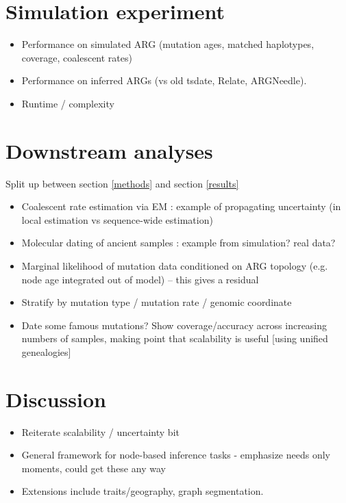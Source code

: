 \documentclass{article}
\begin{document}
\section{Simulation experiment}
\begin{itemize}
\item Performance on simulated ARG (mutation ages, matched haplotypes, coverage, coalescent rates)
\item Performance on inferred ARGs (vs old tsdate, Relate, ARGNeedle).
\item Runtime / complexity
\end{itemize}


\section{Downstream analyses}
Split up between section \ref{methods} and section \ref{results}
\begin{itemize}
\item Coalescent rate estimation via EM : example of propagating uncertainty (in local estimation vs sequence-wide estimation)
\item Molecular dating of ancient samples : example from simulation? real data?
\item Marginal likelihood of mutation data conditioned on ARG topology (e.g. node age integrated out of model) -- this gives a residual
\item Stratify by mutation type / mutation rate / genomic coordinate
\item Date some famous mutations? Show coverage/accuracy across increasing numbers of samples, making point that scalability is useful [using unified genealogies]
\end{itemize}

\section{Discussion}
\begin{itemize}
\item Reiterate scalability / uncertainty bit
\item General framework for node-based inference tasks - emphasize needs only moments, could get these any way
\item Extensions include traits/geography, graph segmentation.
\end{itemize}
\end{document}
